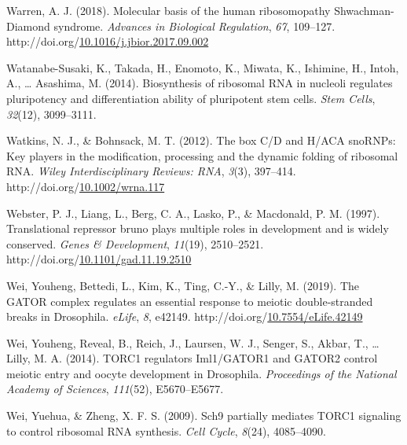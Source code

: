 \documentclass[12pt,oneside]{reedthesis}
\newlength{\cslhangindent}
\newenvironment{CSLReferences}[2] %
 {%
  \setlength{\parindent}{0pt}
  \ifodd #1 \everypar{\setlength{\hangindent}{\cslhangindent}}\ignorespaces\fi
  \ifnum #2 > 0
  \setlength{\parskip}{#2\baselineskip}
  \fi
 }%
 {}
\begin{document}
\begin{CSLReferences}{1}{0}
\leavevmode{}%
Warren, A. J. (2018). Molecular basis of the human ribosomopathy {Shwachman}-{Diamond} syndrome. \emph{Advances in Biological Regulation}, \emph{67}, 109--127. http://doi.org/\href{https://doi.org/10.1016/j.jbior.2017.09.002}{10.1016/j.jbior.2017.09.002}

\leavevmode{}%
Watanabe-Susaki, K., Takada, H., Enomoto, K., Miwata, K., Ishimine, H., Intoh, A., \ldots{} Asashima, M. (2014). Biosynthesis of ribosomal {RNA} in nucleoli regulates pluripotency and differentiation ability of pluripotent stem cells. \emph{Stem Cells}, \emph{32}(12), 3099--3111.

\leavevmode{}%
Watkins, N. J., \& Bohnsack, M. T. (2012). The box {C}/{D} and {H}/{ACA snoRNPs}: {Key} players in the modification, processing and the dynamic folding of ribosomal {RNA}. \emph{Wiley Interdisciplinary Reviews: RNA}, \emph{3}(3), 397--414. http://doi.org/\href{https://doi.org/10.1002/wrna.117}{10.1002/wrna.117}

\leavevmode{}%
Webster, P. J., Liang, L., Berg, C. A., Lasko, P., \& Macdonald, P. M. (1997). Translational repressor bruno plays multiple roles in development and is widely conserved. \emph{Genes \& Development}, \emph{11}(19), 2510--2521. http://doi.org/\href{https://doi.org/10.1101/gad.11.19.2510}{10.1101/gad.11.19.2510}

\leavevmode{}%
Wei, Youheng, Bettedi, L., Kim, K., Ting, C.-Y., \& Lilly, M. (2019). The {GATOR} complex regulates an essential response to meiotic double-stranded breaks in {Drosophila}. \emph{eLife}, \emph{8}, e42149. http://doi.org/\href{https://doi.org/10.7554/eLife.42149}{10.7554/eLife.42149}

\leavevmode{}%
Wei, Youheng, Reveal, B., Reich, J., Laursen, W. J., Senger, S., Akbar, T., \ldots{} Lilly, M. A. (2014). {TORC1} regulators {Iml1}/{GATOR1} and {GATOR2} control meiotic entry and oocyte development in {Drosophila}. \emph{Proceedings of the National Academy of Sciences}, \emph{111}(52), E5670--E5677.

\leavevmode{}%
Wei, Yuehua, \& Zheng, X. F. S. (2009). Sch9 partially mediates {TORC1} signaling to control ribosomal {RNA} synthesis. \emph{Cell Cycle}, \emph{8}(24), 4085--4090.


\end{CSLReferences}
\end{document}
